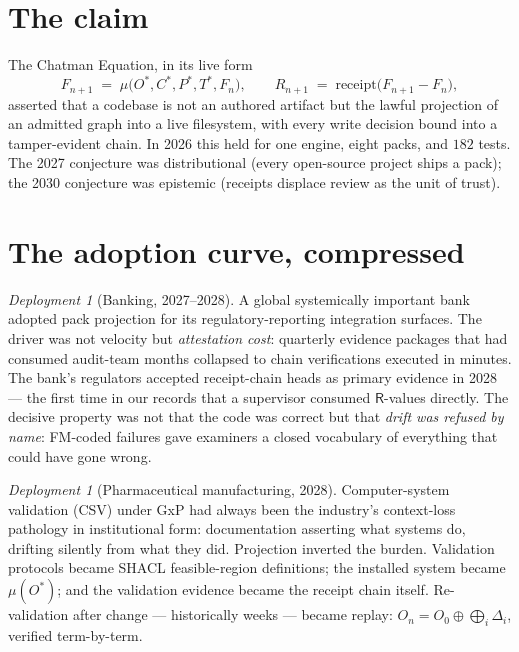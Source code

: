 \documentclass[11pt,a4paper]{report}
\theoremstyle{definition}
\theoremstyle{remark}
\newtheorem{casestudy}[theorem]{Deployment}
\newcommand{\rec}{\mathsf{R}}
\newcommand{\mymu}{\mu}
\newcommand{\del}{\Delta}
\begin{document}
\section{The claim}

The Chatman Equation, in its live form
\[
  F_{n+1} \;=\; \mymu\bigl(O^{*}, C^{*}, P^{*}, T^{*}, F_{n}\bigr),
  \qquad
  R_{n+1} \;=\; \mathrm{receipt}\bigl(F_{n+1} - F_{n}\bigr),
\]
asserted that a codebase is not an authored artifact but the lawful
projection of an admitted graph into a live filesystem, with every write
decision bound into a tamper-evident chain. In 2026 this held for one
engine, eight packs, and $182$ tests. The 2027 conjecture was distributional
(every open-source project ships a pack); the 2030 conjecture was
epistemic (receipts displace review as the unit of trust).

\section{The adoption curve, compressed}

\begin{casestudy}[Banking, 2027--2028]\label{dep:bank}
A global systemically important bank adopted pack projection for its
regulatory-reporting integration surfaces. The driver was not velocity but
\emph{attestation cost}: quarterly evidence packages that had consumed
audit-team months collapsed to chain verifications executed in minutes.
The bank's regulators accepted receipt-chain heads as primary evidence in
2028 --- the first time in our records that a supervisor consumed
$\rec$-values directly. The decisive property was not that the code was
correct but that \emph{drift was refused by name}: FM-coded failures gave
examiners a closed vocabulary of everything that could have gone wrong.
\end{casestudy}

\begin{casestudy}[Pharmaceutical manufacturing, 2028]\label{dep:pharma}
Computer-system validation (CSV) under GxP had always been the industry's
context-loss pathology in institutional form: documentation asserting what
systems do, drifting silently from what they did. Projection inverted the
burden. Validation protocols became SHACL feasible-region definitions;
the installed system became $\mymu(O^{*})$; and the validation evidence
became the receipt chain itself. Re-validation after change --- historically
weeks --- became replay: $O_n = O_0 \oplus \bigoplus_i \del_i$, verified
term-by-term.
\end{casestudy}
\end{document}
